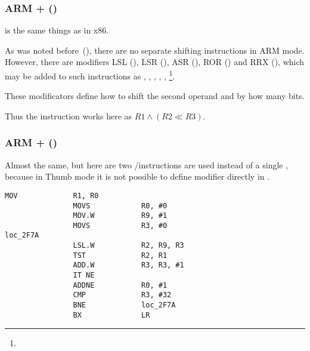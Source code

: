 \subsubsection{ARM + \OptimizingXcodeIV (\ARMMode)}



\TST is the same things as \TEST in x86.

As was noted before~(),
there are no separate shifting instructions in ARM mode.
However, there are modifiers 
LSL (), 
LSR (), 
ASR (), 
ROR () and
RRX (), which may be added to such instructions as \MOV, \TST,
\CMP, \ADD, \SUB, \RSB\footnote{\DataProcessingInstructionsFootNote}.

These modificators define how to shift the second operand and by how many bits.

Thus the  instruction works here as $R1 \land (R2 \ll R3)$.

\subsubsection{ARM + \OptimizingXcodeIV (\ThumbTwoMode)}

Almost the same, but here are two /\TST instructions are used instead of a single \TST, because in Thumb mode it is not
possible to define \LSL modifier directly in \TST.

\begin{lstlisting}[label=ARM_leaf_example5,style=customasmARM]
                MOV             R1, R0
                MOVS            R0, #0
                MOV.W           R9, #1
                MOVS            R3, #0
loc_2F7A
                LSL.W           R2, R9, R3
                TST             R2, R1
                ADD.W           R3, R3, #1
                IT NE
                ADDNE           R0, #1
                CMP             R3, #32
                BNE             loc_2F7A
                BX              LR
\end{lstlisting}

